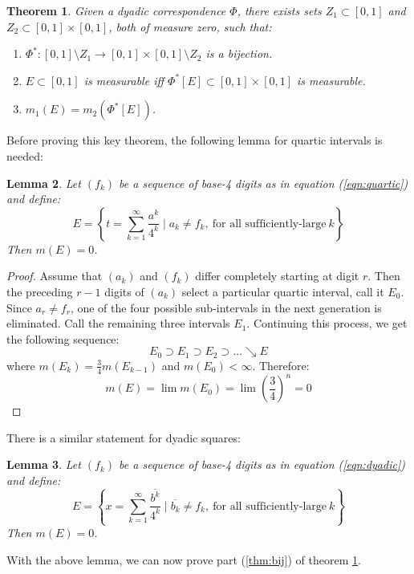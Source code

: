 \documentclass[letterpaper,12pt,fleqn,reqno]{amsart}
\newcommand{\uint}{[0,1]}
\newcommand{\usq}{\uint\times\uint}
\theoremstyle{plain}
\newtheorem{thm}{Theorem}[section]
\newtheorem{lem}[thm]{Lemma}
\begin{document}
\begin{thm}
Given a dyadic correspondence $\Phi$, there exists sets $Z_1\subset\uint$ and
$Z_2\subset\usq$, both of measure zero, such that:
\begin{enumerate}
\item\label{thm:bij} $\Phi^*:\uint\setminus Z_1\to\usq\setminus Z_2$ is a
bijection.
\item\label{thm:pres} $E\subset\uint$ is measurable iff $\Phi^*[E]\subset\usq$
is measurable.
\item\label{thm:meas} $m_1(E)=m_2(\Phi^*[E])$.
\end{enumerate}
\label{thm:key}
\end{thm}

Before proving this key theorem, the following lemma for quartic intervals is
needed:

\begin{lem}
Let $(f_k)$ be a sequence of base-4 digits as in equation (\ref{eqn:quartic})
and define:
\[E=\left\{t=\sum_{k=1}^{\infty}\frac{a^k}{4^k}\mid
    a_k\ne f_k,\ \mbox{for all sufficiently-large}\ k\right\}\]
Then $m(E)=0$.
\label{lem:quartic}
\end{lem}

\begin{proof}
Assume that $(a_k)$ and $(f_k)$ differ completely starting at digit $r$. Then
the preceding $r-1$ digits of $(a_k)$ select a particular quartic interval, call
it $E_0$. Since $a_r\ne f_r$, one of the four possible sub-intervals in the
next generation is eliminated. Call the remaining three intervals $E_1$.
Continuing this process, we get the following sequence:
\[E_0\supset E_1\supset E_2\supset\ldots\searrow E\]
where $m(E_k)=\frac{3}{4}m(E_{k-1})$ and $m(E_0)<\infty$. Therefore:
\[m(E)=\lim{m(E_0)}=\lim{\left(\frac{3}{4}\right)^n=0}\]
\end{proof}

There is a similar statement for dyadic squares:

\begin{lem}
Let $(f_k)$ be a sequence of base-4 digits as in equation (\ref{eqn:dyadic})
and define:
\[E=\left\{x=\sum_{k=1}^{\infty}\frac{\overline{b^k}}{4^k}\mid
    \overline{b_k}\ne f_k,\ \mbox{for all sufficiently-large}\ k\right\}\]
Then $m(E)=0$.
\label{lem:dyadic}
\end{lem}

With the above lemma, we can now prove part (\ref{thm:bij}) of theorem
\ref{thm:key}.
\end{document}
